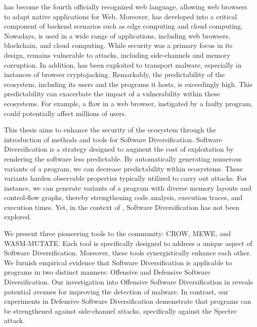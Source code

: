 
\Wasm has become the fourth officially recognized web language, allowing web browsers to adapt native applications for Web.
Moreover, \Wasm has developed into a critical component of backend scenarios such as edge computing and cloud computing.
Nowadays, \Wasm is used in a wide range of applications, including web browsers, blockchain, and cloud computing.
While security was a primary focus in its design, \Wasm remains vulnerable to attacks, including side-channels and memory corruption.
In addition, \Wasm has been exploited to transport malware, especially in instances of browser cryptojacking.
Remarkably, the predictability of the \Wasm ecosystem, including its users and the programs it hosts, is exceedingly high.
This predictability can exacerbate the impact of a vulnerability within these ecosystems.
For example, a flaw in a web browser, instigated by a faulty \Wasm program, could potentially affect millions of users.


This thesis aims to enhance the security of the \Wasm ecosystem through the introduction of methods and tools for Software Diversification.
Software Diversification is a strategy designed to augment the cost of exploitation by rendering the software less predictable.
By automatically generating numerous variants of a program, we can decrease predictability within ecosystems.
These variants harden observable properties typically utilized to carry out attacks.
For instance, we can generate variants of a program with diverse memory layouts and control-flow graphs, thereby strengthening code analysis, execution traces, and execution times.
Yet, in the context of \Wasm, Software Diversification has not been explored.



We present three pioneering tools to the community: CROW, MEWE, and WASM-MUTATE. 
Each tool is specifically designed to address a unique aspect of Software Diversification. 
Moreover, these tools synergistically enhance each other. 
We furnish empirical evidence that Software Diversification is applicable to \Wasm programs in two distinct manners: Offensive and Defensive Software Diversification. 
Our investigation into Offensive Software Diversification in \Wasm reveals potential avenues for improving the detection of \Wasm malware. 
In contrast, our experiments in Defensive Software Diversification demonstrate that \Wasm programs can be strengthened against side-channel attacks, specifically against the Spectre attack.


